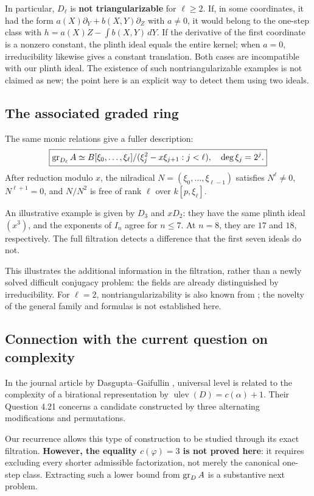 In particular, $D_\ell$ is \textbf{not triangularizable} for $\ell\ge2$. If, in some coordinates, it had the form $a(X)\partial_Y+b(X,Y)\partial_Z$ with $a\ne0$, it would belong to the one-step class with $h=a(X)Z-\int b(X,Y)\,dY$. If the derivative of the first coordinate is a nonzero constant, the plinth ideal equals the entire kernel; when $a=0$, irreducibility likewise gives a constant translation. Both cases are incompatible with our plinth ideal. The existence of such nontriangularizable examples is not claimed as new; the point here is an explicit way to detect them using two ideals.

\subsection*{The associated graded ring}
The same monic relations give a fuller description:
\[
\boxed{\operatorname{gr}_{D_\ell}A\simeq
B[\xi_0,\ldots,\xi_\ell]/(\xi_j^2-x\xi_{j+1}:j<\ell),\quad
\deg\xi_j=2^j.}
\]
After reduction modulo $x$, the nilradical $N=(\xi_0,\ldots,\xi_{\ell-1})$ satisfies $N^\ell\ne0$, $N^{\ell+1}=0$, and $N/N^2$ is free of rank $\ell$ over $k[p,\xi_\ell]$.

An illustrative example is given by $D_3$ and $xD_2$: they have the same plinth ideal $(x^3)$, and the exponents of $I_n$ agree for $n\le7$. At $n=8$, they are $17$ and $18$, respectively. The full filtration detects a difference that the first seven ideals do not.

This illustrates the additional information in the filtration, rather than a newly solved difficult conjugacy problem: the fields are already distinguished by irreducibility.
For $\ell=2$, nontriangularizability is also known from
\cite[Example 4.19]{DG}; the novelty of the general family and formulas is not established here.

\subsection*{Connection with the current question on complexity}
In the journal article by Dasgupta--Gaifullin \cite[Theorem 4.12]{DG}, universal level is related to the complexity of a birational representation by $\operatorname{ulev}(D)=c(\alpha)+1$. Their Question 4.21 concerns a candidate constructed by three alternating modifications and permutations.

Our recurrence allows this type of construction to be studied through its exact filtration. \textbf{However, the equality $c(\varphi)=3$ is not proved here}: it requires excluding every shorter admissible factorization, not merely the canonical one-step class. Extracting such a lower bound from $\operatorname{gr}_DA$ is a substantive next problem.

